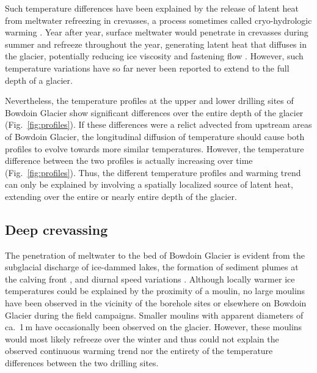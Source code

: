 \documentclass[utf8]{article}
\begin{document}
    Such temperature differences have been explained by the release of latent
    heat from meltwater refreezing in crevasses, a process sometimes called
    cryo-hydrologic warming \citep{Phillips.etal.2010}. Year after year,
    surface meltwater would penetrate in crevasses during summer and refreeze
    throughout the year, generating latent heat that diffuses in the
    glacier, potentially reducing ice viscosity and fastening flow
    \citep{Phillips.etal.2013}. However, such temperature variations have so
    far never been reported to extend to the full depth of a glacier.

    Nevertheless, the temperature profiles at the upper and lower drilling
    sites of Bowdoin Glacier show significant differences over the entire depth
    of the glacier (Fig.~\ref{fig:profiles}). If these differences were a
    relict advected from upstream areas of Bowdoin Glacier, the longitudinal
    diffusion of temperature should cause both profiles to evolve towards more
    similar temperatures. However, the temperature difference between the two
    profiles is actually increasing over time (Fig.~\ref{fig:profiles}).
    Thus, the different temperature profiles and warming trend can only be
    explained by involving a spatially localized source of latent heat,
    extending over the entire or nearly entire depth of the glacier.


\subsection{Deep crevassing}

    The penetration of meltwater to the bed of Bowdoin Glacier is evident from
    the subglacial discharge of ice-dammed lakes, the formation of sediment
    plumes at the calving front \citep{Jouvet.etal.2018, Kanna.etal.2018}, and
    diurnal speed variations \citep{Sugiyama.etal.2014, Podolskiy.etal.2016}.
    Although locally warmer ice temperatures could be explained by the
    proximity of a moulin, no large moulins have been observed in the vicinity
    of the borehole sites or elsewhere on Bowdoin Glacier during the field
    campaigns. Smaller moulins with apparent diameters of ca.~1\,m have
    occasionally been observed on the glacier. However, these moulins would
    most likely refreeze over the winter and thus could not explain the
    observed continuous warming trend nor the entirety of the temperature
    differences between the two drilling sites.
\end{document}
